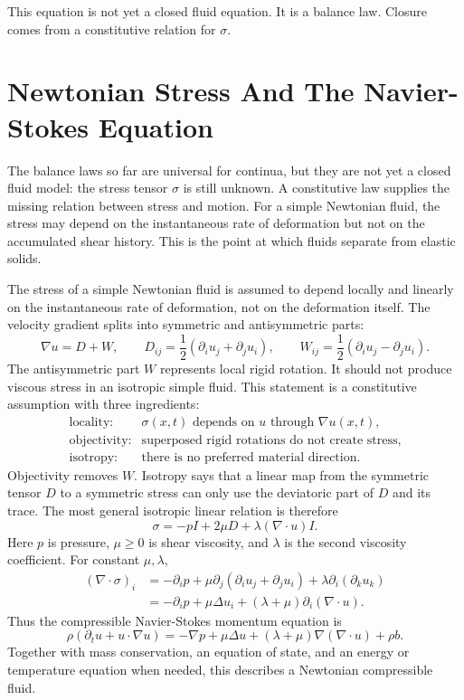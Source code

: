This equation is not yet a closed fluid equation. It is a balance law. Closure
comes from a constitutive relation for \(\sigma\).

\section{Newtonian Stress And The Navier-Stokes Equation}
\label{sec:navier-stokes-derivation}

The balance laws so far are universal for continua, but they are not yet a
closed fluid model: the stress tensor \(\sigma\) is still unknown. A
constitutive law supplies the missing relation between stress and motion. For a
simple Newtonian fluid, the stress may depend on the instantaneous rate of
deformation but not on the accumulated shear history. This is the point at
which fluids separate from elastic solids.

The stress of a simple Newtonian fluid is assumed to depend locally and
linearly on the instantaneous rate of deformation, not on the deformation
itself. The velocity gradient splits into symmetric and antisymmetric parts:
\[
  \nabla u=D+W,
  \qquad
  D_{ij}=\frac12(\partial_i u_j+\partial_j u_i),
  \qquad
  W_{ij}=\frac12(\partial_i u_j-\partial_j u_i).
\]
The antisymmetric part \(W\) represents local rigid rotation. It should not
produce viscous stress in an isotropic simple fluid. This statement is a
constitutive assumption with three ingredients:
\[
\begin{array}{ll}
\text{locality:} & \sigma(x,t) \text{ depends on } u \text{ through }
  \nabla u(x,t),\\
\text{objectivity:} & \text{superposed rigid rotations do not create stress},\\
\text{isotropy:} & \text{there is no preferred material direction}.
\end{array}
\]
Objectivity removes \(W\). Isotropy says that a linear map from the symmetric
tensor \(D\) to a symmetric stress can only use the deviatoric part of \(D\)
and its trace. The most general isotropic linear relation is therefore
\[
  \boxed{
  \sigma=-pI+2\mu D+\lambda(\nabla\cdot u)I.
  }
\]
Here \(p\) is pressure, \(\mu\geq0\) is shear viscosity, and \(\lambda\) is the
second viscosity coefficient. For constant \(\mu,\lambda\),
\[
\begin{aligned}
  (\nabla\cdot\sigma)_i
  &=
  -\partial_i p
  +
  \mu\partial_j(\partial_i u_j+\partial_j u_i)
  +
  \lambda\partial_i(\partial_k u_k)\\
  &=
  -\partial_i p
  +
  \mu\Delta u_i
  +
  (\lambda+\mu)\partial_i(\nabla\cdot u).
\end{aligned}
\]
Thus the compressible Navier-Stokes momentum equation is
\[
  \boxed{
  \rho
  \left(
    \partial_tu+u\cdot\nabla u
  \right)
  =
  -\nabla p+\mu\Delta u+(\lambda+\mu)\nabla(\nabla\cdot u)+\rho b.
  }
\]
Together with mass conservation, an equation of state, and an energy or
temperature equation when needed, this describes a Newtonian compressible fluid.

